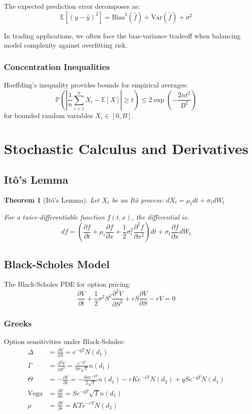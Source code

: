 \documentclass[11pt,letterpaper,openany]{book}
\newtheorem{theorem}{Theorem}[chapter]
\newcommand{\Var}{\mathrm{Var}}
\newcommand{\Bias}{\mathrm{Bias}}
\newcommand{\Vega}{\mathrm{Vega}}
\begin{document}
The expected prediction error decomposes as:
\[
\mathbb{E}[(y - \hat{y})^2] = \Bias^2(\hat{f}) + \Var(\hat{f}) + \sigma^2
\]

In trading applications, we often face the bias-variance tradeoff when balancing model complexity against overfitting risk.

\subsubsection{Concentration Inequalities}

Hoeffding's inequality provides bounds for empirical averages:
\[
\mathbb{P}\left( \left| \frac{1}{n} \sum_{i=1}^n X_i - \mathbb{E}[X] \right| \geq t \right) \leq 2\exp\left( -\frac{2n t^2}{B^2} \right)
\]
for bounded random variables $X_i \in [0, B]$.

\section{Stochastic Calculus and Derivatives}

\subsection{Itô's Lemma}

\begin{theorem}[Itô's Lemma]
Let $X_t$ be an Itô process: $dX_t = \mu_t dt + \sigma_t dW_t$

For a twice-differentiable function $f(t,x)$, the differential is:
\[
df = \left( \frac{\partial f}{\partial t} + \mu_t \frac{\partial f}{\partial x} + \frac{1}{2} \sigma_t^2 \frac{\partial^2 f}{\partial x^2} \right) dt + \sigma_t \frac{\partial f}{\partial x} dW_t
\]
\end{theorem}

\subsection{Black-Scholes Model}

The Black-Scholes PDE for option pricing:
\[
\frac{\partial V}{\partial t} + \frac{1}{2} \sigma^2 S^2 \frac{\partial^2 V}{\partial S^2} + r S \frac{\partial V}{\partial S} - r V = 0
\]

\subsubsection{Greeks}

Option sensitivities under Black-Scholes:
\begin{align}
\Delta &= \frac{\partial V}{\partial S} = e^{-qT} N(d_1) \\
\Gamma &= \frac{\partial^2 V}{\partial S^2} = \frac{e^{-qT}}{S \sigma \sqrt{T}} n(d_1) \\
\Theta &= -\frac{\partial V}{\partial t} = -\frac{S \sigma e^{-qT}}{2\sqrt{T}} n(d_1) - r K e^{-rT} N(d_2) + q S e^{-qT} N(d_1) \\
\Vega &= \frac{\partial V}{\partial \sigma} = S e^{-qT} \sqrt{T} n(d_1) \\
\rho &= \frac{\partial V}{\partial r} = K T e^{-rT} N(d_2)
\end{align}
\end{document}
